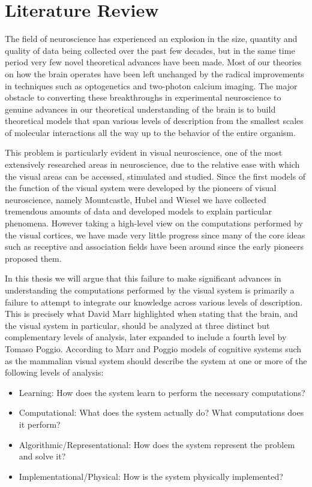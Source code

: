 \chapter{Literature Review}

The field of neuroscience has experienced an explosion in the size,
quantity and quality of data being collected over the past few
decades, but in the same time period very few novel theoretical
advances have been made. Most of our theories on how the brain
operates have been left unchanged by the radical improvements in
techniques such as optogenetics and two-photon calcium imaging. The
major obstacle to converting these breakthroughs in experimental
neuroscience to genuine advances in our theoretical understanding of
the brain is to build theoretical models that span various levels of
description from the smallest scales of molecular interactions all the
way up to the behavior of the entire organism.

This problem is particularly evident in visual neuroscience, one of
the most extensively researched areas in neuroscience, due to the
relative ease with which the visual areas can be accessed, stimulated
and studied. Since the first models of the function of the visual
system were developed by the pioneers of visual neuroscience, namely
Mountcastle, Hubel and Wiesel we have collected tremendous amounts of
data and developed models to explain particular phenomena. However
taking a high-level view on the computations performed by the visual
cortices, we have made very little progress since many of the core
ideas such as receptive and association fields have been around since
the early pioneers proposed them.

In this thesis we will argue that this failure to make significant
advances in understanding the computations performed by the visual
system is primarily a failure to attempt to integrate our knowledge
across various levels of description. This is precisely what David
Marr highlighted when stating that the brain, and the visual system in
particular, should be analyzed at three distinct but complementary
levels of analysis, later expanded to include a fourth level by Tomaso
Poggio. According to Marr and Poggio models of cognitive systems such
as the mammalian visual system should describe the system at one or
more of the following levels of analysis:

\begin{itemize}
\item Learning: How does the system learn to perform the necessary
  computations?
\item Computational: What does the system actually do? What
  computations does it perform?
\item Algorithmic/Representational: How does the system represent the
  problem and solve it?
\item Implementational/Physical: How is the system physically
  implemented?
\end{itemize}

